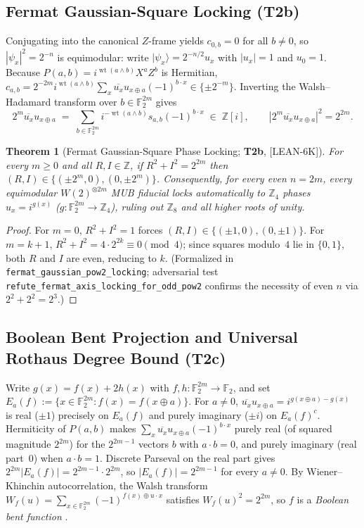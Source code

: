 \documentclass[11pt,reqno]{amsart}
\newtheorem{theorem}{Theorem}[section]
\theoremstyle{definition}
\newcommand{\F}{\mathbb{F}}
\newcommand{\Z}{\mathbb{Z}}
\newcommand{\pop}{\operatorname{wt}}
\newcommand{\taglean}{\textsf{[LEAN-6K]}}
\begin{document}
\subsection{Fermat Gaussian-Square Locking (T2b)}
Conjugating into the canonical $Z$-frame yields $c_{0,b}=0$ for all $b\neq 0$, so
$|\psi_x|^2=2^{-n}$ is equimodular: write $|\psi_x\rangle=2^{-n/2}u_x$ with $|u_x|=1$
and $u_0=1$. Because $P(a,b)=i^{\pop(a\wedge b)}X^aZ^b$ is Hermitian,
$c_{a,b}=2^{-2m}i^{\pop(a\wedge b)}\sum_x\overline{u_x}u_{x\oplus a}(-1)^{b\cdot x}\in\{\pm 2^{-m}\}$.
Inverting the Walsh--Hadamard transform over $b\in\F_2^{2m}$ gives
\begin{equation}\label{eq:inv-walsh}
  2^m \overline{u_x} u_{x\oplus a}
  \;=\;
  \sum_{b\in\F_2^{2m}} i^{-\pop(a\wedge b)} s_{a,b} (-1)^{b\cdot x}
  \;\in\; \Z[i],
  \qquad |2^m\overline{u_x}u_{x\oplus a}|^2 = 2^{2m}.
\end{equation}

\begin{theorem}[Fermat Gaussian-Square Phase Locking; \textbf{T2b}, \taglean]\label{thm:fermat}
For every $m\ge 0$ and all $R,I\in\Z$, if $R^2+I^2=2^{2m}$ then
$(R,I)\in\{(\pm 2^m,0),(0,\pm 2^m)\}$. Consequently, for every even $n=2m$, every
equimodular $W(2)^{\otimes 2m}$ MUB fiducial locks automatically to $\Z_4$ phases
$u_x=i^{g(x)}$ ($g:\F_2^{2m}\to\Z_4$), ruling out $\Z_8$ and all higher roots of unity.
\end{theorem}

\begin{proof}
For $m=0$, $R^2+I^2=1$ forces $(R,I)\in\{(\pm 1,0),(0,\pm 1)\}$. For $m=k+1$,
$R^2+I^2=4\cdot 2^{2k}\equiv 0\pmod 4$; since squares modulo~$4$ lie in $\{0,1\}$, both
$R$ and $I$ are even, reducing to $k$. (Formalized in \texttt{fermat\_gaussian\_pow2\_locking};
adversarial test \texttt{refute\_fermat\_axis\_locking\_for\_odd\_pow2} confirms the
necessity of even $n$ via $2^2+2^2=2^3$.)
\end{proof}

\subsection{Boolean Bent Projection and Universal Rothaus Degree Bound (T2c)}
Write $g(x)=f(x)+2h(x)$ with $f,h:\F_2^{2m}\to\F_2$, and set
$E_a(f):=\{x\in\F_2^{2m}: f(x)=f(x\oplus a)\}$. For $a\neq 0$,
$\overline{u_x}u_{x\oplus a}=i^{g(x\oplus a)-g(x)}$ is real ($\pm 1$) precisely on
$E_a(f)$ and purely imaginary ($\pm i$) on $E_a(f)^c$. Hermiticity of $P(a,b)$ makes
$\sum_x \overline{u_x}u_{x\oplus a}(-1)^{b\cdot x}$ purely real (of squared magnitude
$2^{2m}$) for the $2^{2m-1}$ vectors $b$ with $a\cdot b=0$, and purely imaginary (real
part~$0$) when $a\cdot b=1$. Discrete Parseval on the real part gives
$2^{2m}|E_a(f)|=2^{2m-1}\cdot 2^{2m}$, so $|E_a(f)|=2^{2m-1}$ for every $a\neq 0$.
By Wiener--Khinchin autocorrelation, the Walsh transform
$W_f(u)=\sum_{x\in\F_2^{2m}}(-1)^{f(x)\oplus u\cdot x}$ satisfies $W_f(u)^2=2^{2m}$, so
$f$ is a \emph{Boolean bent function} \cite{Rothaus1976Bent}.
\end{document}
